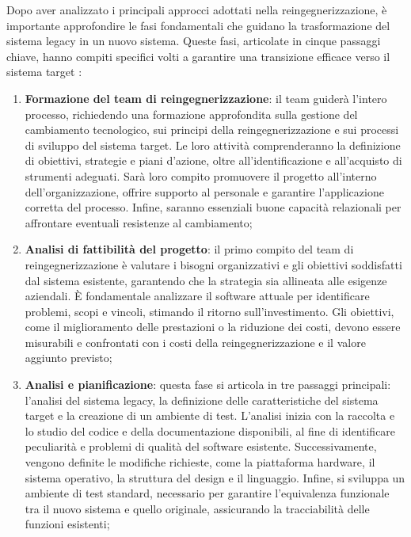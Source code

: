 Dopo aver analizzato i principali approcci adottati nella reingegnerizzazione, è importante approfondire le fasi fondamentali che guidano la trasformazione del sistema legacy in un nuovo sistema. Queste fasi, articolate in cinque passaggi chiave, hanno compiti specifici volti a garantire una transizione efficace verso il sistema target \cite{rosenberg1996software}:
\begin{enumerate}
  \item \textbf{Formazione del team di reingegnerizzazione}: il team guiderà l'intero processo, richiedendo una formazione approfondita sulla gestione del cambiamento tecnologico, sui principi della reingegnerizzazione e sui processi di sviluppo del sistema target. Le loro attività comprenderanno la definizione di obiettivi, strategie e piani d’azione, oltre all'identificazione e all'acquisto di strumenti adeguati. Sarà loro compito promuovere il progetto all’interno dell’organizzazione, offrire supporto al personale e garantire l’applicazione corretta del processo. Infine, saranno essenziali buone capacità relazionali per affrontare eventuali resistenze al cambiamento;

  \item \textbf{Analisi di fattibilità del progetto}: il primo compito del team di reingegnerizzazione è valutare i bisogni organizzativi e gli obiettivi soddisfatti dal sistema esistente, garantendo che la strategia sia allineata alle esigenze aziendali. È fondamentale analizzare il software attuale per identificare problemi, scopi e vincoli, stimando il ritorno sull’investimento. Gli obiettivi, come il miglioramento delle prestazioni o la riduzione dei costi, devono essere misurabili e confrontati con i costi della reingegnerizzazione e il valore aggiunto previsto;

  \item \textbf{Analisi e pianificazione}: questa fase si articola in tre passaggi principali: l'analisi del sistema legacy, la definizione delle caratteristiche del sistema target e la creazione di un ambiente di test. L'analisi inizia con la raccolta e lo studio del codice e della documentazione disponibili, al fine di identificare peculiarità e problemi di qualità del software esistente. Successivamente, vengono definite le modifiche richieste, come la piattaforma hardware, il sistema operativo, la struttura del design e il linguaggio. Infine, si sviluppa un ambiente di test standard, necessario per garantire l’equivalenza funzionale tra il nuovo sistema e quello originale, assicurando la tracciabilità delle funzioni esistenti;


\end{enumerate}
